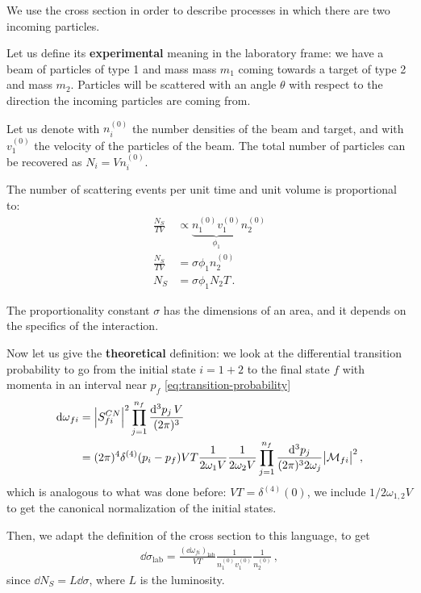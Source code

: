 \documentclass[main.tex]{subfiles}
\begin{document}
We use the cross section in order to describe processes in which there are two incoming particles. 

Let us define its \textbf{experimental} meaning in the laboratory frame: we have a beam of particles of type 1 and mass mass \(m_1 \) coming towards a target of type 2 and mass \(m_2 \). 
Particles will be scattered with an angle \(\theta \) with respect to the direction the incoming particles are coming from. 

Let us denote with \(n_{i}^{(0)}\) the number densities of the beam and target, and with \(v_{1}^{(0)}\) the velocity of the particles of the beam. 
The total number of particles can be recovered as \(N_i = V n_i^{(0)}\).

The number of scattering events per unit time and unit volume is proportional to: 
%
\begin{align}
\frac{N_S}{T V} &\propto \underbrace{n_1^{(0)} v_1 ^{(0)}}_{\phi_1 } n^{(0)}_{2}  \\
\frac{N_S}{T V} &= \sigma \phi_1 n^{(0)}_{2} \\
N_S &= \sigma \phi_1 N_2 T
\,.
\end{align}

The proportionality constant \(\sigma \) has the dimensions of an area, and it depends on the specifics of the interaction. 

Now let us give the \textbf{theoretical} definition: we look at the differential transition probability to go from the initial state \(i = 1+2\) to the final state \(f\) with momenta in an interval near \(p_f\) \eqref{eq:transition-probability}
%
\begin{align}
\dd{\omega}_{fi} &= \abs{S^{CN}_{fi}}^2 \prod_{j=1}^{n_f} \frac{ \dd[3]{p_j} V}{(2 \pi )^3}  \\
&= (2\pi )^{4} \delta^{(4)} (p_i - p_f) VT \frac{1}{2 \omega_{1} V}
\frac{1}{2 \omega_{2}V}
\prod_{j=1}^{n_f} \frac{ \dd[3]{p_j}}{(2 \pi )^3 2 \omega_{j}}
\abs{\mathcal{M}_{fi}}^2
\,,
\end{align}
%
which is analogous to what was done before: \(VT = \delta^{(4)}(0)\), we include \(1 / 2 \omega_{1, 2} V\) to get the canonical normalization of the initial states. 

Then, we adapt the definition of the cross section to this language, to get
%
\begin{align}
\dd{\sigma }_{\text{lab}} = \frac{ (\dd{\omega_{fi}} ) _{\text{lab}}}{VT} 
\frac{1}{n_1^{(0)} v_1 ^{(0)}} 
\frac{1}{n_2^{(0)}} 
\,,
\end{align}
%
since \(\dd{N_S} = L \dd{\sigma }\), where \(L\) is the luminosity.
\end{document}
